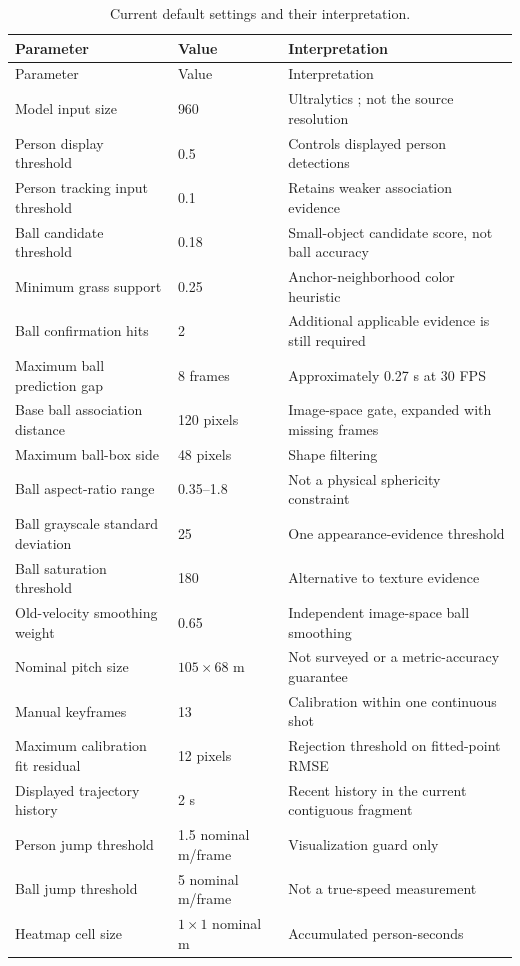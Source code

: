 \documentclass[11pt,a4paper]{article}
\newcommand{\code}[1]{\texttt{\detokenize{#1}}}
\begin{document}
\small
\begin{longtable}{@{}p{5.3cm}p{2.1cm}p{7.6cm}@{}}
\caption{Current default settings and their interpretation.}\\
\toprule
Parameter & Value & Interpretation\\
\midrule
\endfirsthead
\toprule
Parameter & Value & Interpretation\\
\midrule
\endhead
Model input size & 960 & Ultralytics \code{imgsz}; not the source resolution\\
Person display threshold & 0.5 & Controls displayed person detections\\
Person tracking input threshold & 0.1 & Retains weaker association evidence\\
Ball candidate threshold & 0.18 & Small-object candidate score, not ball accuracy\\
Minimum grass support & 0.25 & Anchor-neighborhood color heuristic\\
Ball confirmation hits & 2 & Additional applicable evidence is still required\\
Maximum ball prediction gap & 8 frames & Approximately 0.27 s at 30 FPS\\
Base ball association distance & 120 pixels & Image-space gate, expanded with missing frames\\
Maximum ball-box side & 48 pixels & Shape filtering\\
Ball aspect-ratio range & 0.35--1.8 & Not a physical sphericity constraint\\
Ball grayscale standard deviation & 25 & One appearance-evidence threshold\\
Ball saturation threshold & 180 & Alternative to texture evidence\\
Old-velocity smoothing weight & 0.65 & Independent image-space ball smoothing\\
Nominal pitch size & $105\times68$ m & Not surveyed or a metric-accuracy guarantee\\
Manual keyframes & 13 & Calibration within one continuous shot\\
Maximum calibration fit residual & 12 pixels & Rejection threshold on fitted-point RMSE\\
Displayed trajectory history & 2 s & Recent history in the current contiguous fragment\\
Person jump threshold & 1.5 nominal m/frame & Visualization guard only\\
Ball jump threshold & 5 nominal m/frame & Not a true-speed measurement\\
Heatmap cell size & $1\times1$ nominal m & Accumulated person-seconds\\
\bottomrule
\end{longtable}
\normalsize
\end{document}
